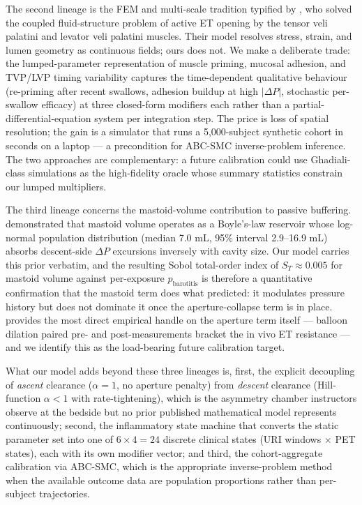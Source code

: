 \documentclass[11pt,a4paper]{article}
\begin{document}
The second lineage is the FEM and multi-scale tradition typified by \citet{Ghadiali2004}, who solved the coupled fluid-structure problem of active ET opening by the tensor veli palatini and levator veli palatini muscles. Their model resolves stress, strain, and lumen geometry as continuous fields; ours does not. We make a deliberate trade: the lumped-parameter representation of muscle priming, mucosal adhesion, and TVP/LVP timing variability captures the time-dependent qualitative behaviour (re-priming after recent swallows, adhesion buildup at high $|\Delta P|$, stochastic per-swallow efficacy) at three closed-form modifiers each rather than a partial-differential-equation system per integration step. The price is loss of spatial resolution; the gain is a simulator that runs a 5{,}000-subject synthetic cohort in seconds on a laptop --- a precondition for ABC-SMC inverse-problem inference. The two approaches are complementary: a future calibration could use Ghadiali-class simulations as the high-fidelity oracle whose summary statistics constrain our lumped multipliers.

The third lineage concerns the mastoid-volume contribution to passive buffering. \citet{Alper2011} demonstrated that mastoid volume operates as a Boyle's-law reservoir whose log-normal population distribution (median 7.0 mL, 95\% interval 2.9--16.9 mL) absorbs descent-side $\Delta P$ excursions inversely with cavity size. Our model carries this prior verbatim, and the resulting Sobol total-order index of $S_T \approx 0.005$ for mastoid volume against per-exposure $p_{\mathrm{barotitis}}$ is therefore a quantitative confirmation that the mastoid term does what \citet{Alper2011} predicted: it modulates pressure history but does not dominate it once the aperture-collapse term is in place. \citet{Alper2020} provides the most direct empirical handle on the aperture term itself --- balloon dilation paired pre- and post-measurements bracket the in vivo ET resistance --- and we identify this as the load-bearing future calibration target.

What our model adds beyond these three lineages is, first, the explicit decoupling of \emph{ascent} clearance ($\alpha = 1$, no aperture penalty) from \emph{descent} clearance (Hill-function $\alpha < 1$ with rate-tightening), which is the asymmetry chamber instructors observe at the bedside but no prior published mathematical model represents continuously; second, the inflammatory state machine that converts the static parameter set into one of $6 \times 4 = 24$ discrete clinical states (URI windows $\times$ PET states), each with its own modifier vector; and third, the cohort-aggregate calibration via ABC-SMC, which is the appropriate inverse-problem method when the available outcome data are population proportions rather than per-subject trajectories.
\end{document}
